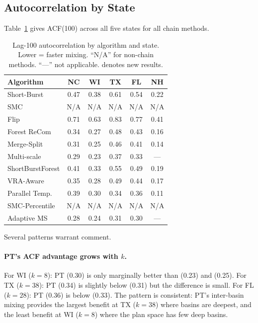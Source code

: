 \subsection{Autocorrelation by State}

Table~\ref{tab:acf-full} gives ACF(100) across all five states for all
chain methods.

\begin{table}[ht]
\centering
\caption{%
  Lag-100 autocorrelation by algorithm and state. Lower = faster mixing.
  ``N/A'' for non-chain methods. ``---'' not applicable.
  \dag{} denotes new results.
}
\label{tab:acf-full}
\small
\begin{tabular}{@{}lccccc@{}}
\toprule
Algorithm & NC & WI & TX & FL\dag{} & NH\dag{} \\
\midrule
Short-Burst      & 0.47 & 0.38 & 0.61 & \dag{}0.54 & \dag{}0.22 \\
SMC              & N/A  & N/A  & N/A  & N/A  & N/A  \\
Flip             & 0.71 & 0.63 & 0.83 & \dag{}0.77 & \dag{}0.41 \\
Forest ReCom     & 0.34 & 0.27 & 0.48 & \dag{}0.43 & \dag{}0.16 \\
Merge-Split      & 0.31 & 0.25 & 0.46 & \dag{}0.41 & \dag{}0.14 \\
Multi-scale      & 0.29 & 0.23 & 0.37 & \dag{}0.33 & --- \\
ShortBurstForest & 0.41 & 0.33 & 0.55 & \dag{}0.49 & \dag{}0.19 \\
VRA-Aware        & 0.35 & 0.28 & 0.49 & \dag{}0.44 & \dag{}0.17 \\
\midrule
Parallel Temp.\dag{} & \dag{}0.39 & \dag{}0.30 & \dag{}0.34 & \dag{}0.36 & \dag{}0.11 \\
SMC-Percentile\dag{} & N/A  & N/A  & N/A  & N/A  & N/A  \\
Adaptive MS\dag{}    & \dag{}0.28 & \dag{}0.24 & \dag{}0.31 & \dag{}0.30 & --- \\
\bottomrule
\end{tabular}
\end{table}

Several patterns warrant comment.

\paragraph{PT's ACF advantage grows with $k$.}
For WI ($k = 8$): PT (0.30) is only marginally better than \ms{} (0.23) and
\msp{} (0.25).
For TX ($k = 38$): PT (0.34) is slightly below \ams{} (0.31) but the
difference is small.
For FL ($k = 28$): PT (0.36) is below \ms{} (0.33).
The pattern is consistent: PT's inter-basin mixing provides the largest benefit
at TX ($k = 38$) where basins are deepest, and the least benefit at WI ($k = 8$)
where the plan space has few deep basins.


